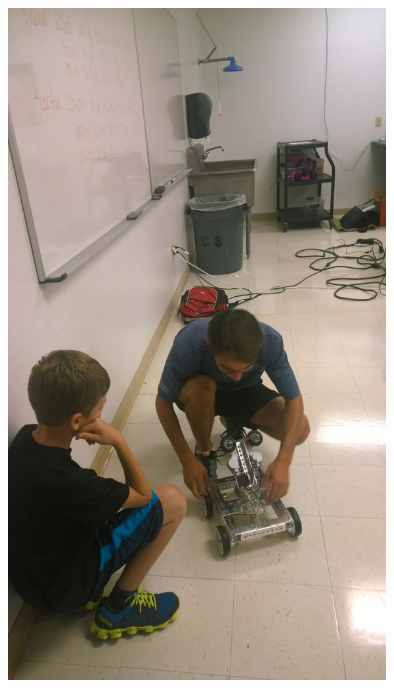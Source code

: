 \begin{center}
 \includegraphics[width=10cm]{./Entries/Images/BenDemoingFTCRobottoAnFLLstudent.jpg}
 \end{center}
